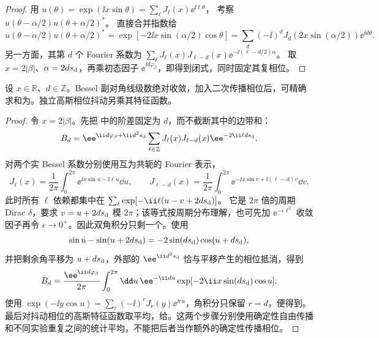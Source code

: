 \begin{proof}
用 $u(\theta)=\exp(\ii x\sin\theta)=\sum_\ell J_\ell(x)\ee^{\ii\ell\theta}$，
考察 $u(\theta-\alpha/2)u(\theta+\alpha/2)^*$。
直接合并指数给
\[
u(\theta-\alpha/2)u(\theta+\alpha/2)^*
=\exp[-2\ii x\sin(\alpha/2)\cos\theta]
=\sum_d(-\ii)^dJ_d(2x\sin(\alpha/2))\ee^{\ii d\theta}.
\]
另一方面，其第 $d$ 个 Fourier 系数为
$\sum_\ell J_\ell(x)J_{\ell-d}(x)\ee^{-\ii(\ell-d/2)\alpha}$。
取 $x=2|\beta|$、$\alpha=2ds_{\rm d}$，再乘初态因子
$\ee^{\ii d\varphi_\beta}$，即得到闭式，同时固定其复相位。
\end{proof}

\begin{proposition}
设 $x\in\mathbb R$、$d\in\mathbb Z$。Bessel 副对角线级数绝对收敛，加入二次传播相位后，可精确求和为。独立高斯相位抖动另乘其特征函数。
\end{proposition}
\begin{proof}
令 $x=2|\beta|$。先把 中的阶差固定为 $d$，而不截断其中的边带和：
\begin{equation*}
 B_d=\ee^{\ii d\varphi_\beta+\ii d^2s_{\rm d}}
 \sum_{\ell\in\mathbb Z}J_\ell(x)J_{\ell-d}(x)
 \ee^{-2\ii\ell ds_{\rm d}}.
\end{equation*}
对两个实 Bessel 系数分别使用互为共轭的 Fourier 表示，
\begin{equation*}
 J_\ell(x)=\frac1{2\pi}\int_0^{2\pi}\ee^{\ii x\sin u-\ii\ell u}\dd u,
 \qquad
 J_{\ell-d}(x)=\frac1{2\pi}\int_0^{2\pi}
 \ee^{-\ii x\sin v+\ii(\ell-d)v}\dd v.
\end{equation*}
此时所有 $\ell$ 依赖都集中在
$\sum_\ell\exp[-\ii\ell(u-v+2ds_{\rm d})]$。
它是 $2\pi$ 倍的周期 Dirac $\delta$，要求 $v=u+2ds_{\rm d}$ 模 $2\pi$；该等式按周期分布理解，也可先加 $\ee^{-\epsilon\ell^2}$ 收敛因子再令 $\epsilon\to0^+$。因此双角积分只剩一个。使用
\begin{equation*}
 \sin u-\sin(u+2ds_{\rm d})
 =-2\sin(ds_{\rm d})\cos(u+ds_{\rm d}),
\end{equation*}
并把剩余角平移为 $u+ds_{\rm d}$，外部的 $\ee^{\ii d^2s_{\rm d}}$ 恰与平移产生的相位抵消，得到
\begin{equation*}
 B_d=\frac{\ee^{\ii d\varphi_\beta}}{2\pi}
 \int_0^{2\pi}\dd u\,\ee^{-\ii du}
 \exp[-2\ii x\sin(ds_{\rm d})\cos u].
\end{equation*}
使用 $\exp(-\ii y\cos u)=\sum_r(-\ii)^rJ_r(y)\ee^{\ii ru}$，角积分只保留 $r=d$，便得到。最后对抖动相位的高斯特征函数取平均，给。这两个步骤分别使用确定性自由传播和不同实验重复之间的统计平均，不能把后者当作额外的确定性传播相位。
\end{proof}



